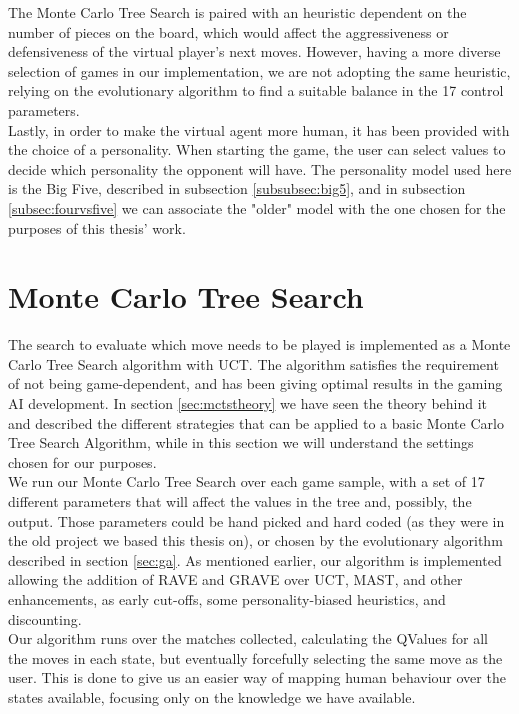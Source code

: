 The Monte Carlo Tree Search is paired with an heuristic dependent on the number of pieces on the board, which would affect the aggressiveness or defensiveness of the virtual player's next moves. However, having a more diverse selection of games in our implementation, we are not adopting the same heuristic, relying on the evolutionary algorithm to find a suitable balance in the 17 control parameters.\\
Lastly, in order to make the virtual agent more human, it has been provided with the choice of a personality. When starting the game, the user can select values to decide which personality the opponent will have. The personality model used here is the Big Five, described in subsection \ref{subsubsec:big5}, and in subsection \ref{subsec:fourvsfive} we can associate the "older" model with the one chosen for the purposes of this thesis' work.
\section{Monte Carlo Tree Search}\label{sec:mctsmet}
The search to evaluate which move needs to be played is implemented as a Monte Carlo Tree Search algorithm with UCT. The algorithm satisfies the requirement of not being game-dependent, and has been giving optimal results in the gaming AI development. In section \ref{sec:mctstheory} we have seen the theory behind it and described the different strategies that can be applied to a basic Monte Carlo Tree Search Algorithm, while in this section we will understand the settings chosen for our purposes.\\
We run our Monte Carlo Tree Search over each game sample, with a set of 17 different parameters that will affect the values in the tree and, possibly, the output. Those parameters could be hand picked and hard coded (as they were in the old project we based this thesis on), or chosen by the evolutionary algorithm described in section \ref{sec:ga}. As mentioned earlier, our algorithm is implemented allowing the addition of RAVE and GRAVE over UCT, MAST, and other enhancements, as early cut-offs, some personality-biased heuristics, and discounting.\\
Our algorithm runs over the matches collected, calculating the QValues for all the moves in each state, but eventually forcefully selecting the same move as the user. This is done to give us an easier way of mapping human behaviour over the states available, focusing only on the knowledge we have available.
